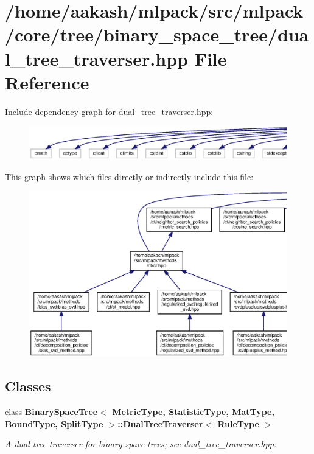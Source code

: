 \section{/home/aakash/mlpack/src/mlpack/core/tree/binary\+\_\+space\+\_\+tree/dual\+\_\+tree\+\_\+traverser.hpp File Reference}
\label{binary__space__tree_2dual__tree__traverser_8hpp}
Include dependency graph for dual\+\_\+tree\+\_\+traverser.\+hpp\+:
\nopagebreak
\begin{figure}[H]
\begin{center}
\leavevmode
\includegraphics[width=350pt]{binary__space__tree_2dual__tree__traverser_8hpp__incl}
\end{center}
\end{figure}
This graph shows which files directly or indirectly include this file\+:
\nopagebreak
\begin{figure}[H]
\begin{center}
\leavevmode
\includegraphics[width=350pt]{binary__space__tree_2dual__tree__traverser_8hpp__dep__incl}
\end{center}
\end{figure}
\subsection*{Classes}
\begin{DoxyCompactItemize}
\item 
class \textbf{ Binary\+Space\+Tree$<$ Metric\+Type, Statistic\+Type, Mat\+Type, Bound\+Type, Split\+Type $>$\+::\+Dual\+Tree\+Traverser$<$ Rule\+Type $>$}
\begin{DoxyCompactList}\small\item\em A dual-\/tree traverser for binary space trees; see dual\+\_\+tree\+\_\+traverser.\+hpp. \end{DoxyCompactList}\end{DoxyCompactItemize}
